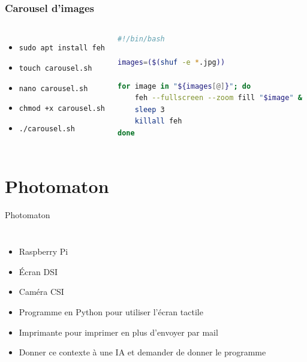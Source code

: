 \documentclass[aspectratio=169,xcolor=dvipsnames]{beamer}
\begin{document}
\begin{frame}[fragile]
\frametitle{Carousel d'images}
    \begin{columns}[c] %

        \begin{itemize}
            \item \texttt{sudo apt install feh}
            \item \texttt{touch carousel.sh}
            \item \texttt{nano carousel.sh}
            \item \texttt{chmod +x carousel.sh}
            \item \texttt{./carousel.sh}
        \end{itemize}

        \begin{lstlisting}[language=Bash, caption=carousel.sh]
#!/bin/bash

images=($(shuf -e *.jpg))

for image in "${images[@]}"; do
    feh --fullscreen --zoom fill "$image" &
    sleep 3
    killall feh
done
        \end{lstlisting}

    \end{columns}
\end{frame}

\section{Photomaton}
\begin{frame}{Photomaton}
    \begin{columns}[c] %

        \begin{itemize}
            \item Raspberry Pi
            \item Écran DSI
            \item Caméra CSI
            \item Programme en Python pour utiliser l'écran tactile
            \item Imprimante pour imprimer en plus d'envoyer par mail
            \item Donner ce contexte à une IA et demander de donner le programme
        \end{itemize}

    \end{columns}
\end{frame}
\end{document}
